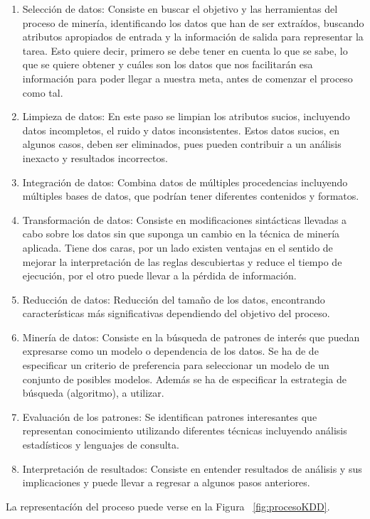 \begin{enumerate}
\item Selección de datos: Consiste en buscar el objetivo y las herramientas del proceso de minería, identificando los datos que han de ser extraídos, buscando atributos apropiados de entrada y la información de salida para representar la tarea. Esto quiere decir, primero se debe tener en cuenta lo que se sabe, lo que se quiere obtener y cuáles son los datos que nos facilitarán esa información para poder llegar a nuestra meta, antes de comenzar el proceso como tal.
\item Limpieza de datos: En este paso se limpian los atributos sucios, incluyendo datos incompletos, el ruido y datos inconsistentes. Estos datos sucios, en algunos casos, deben ser eliminados, pues pueden contribuir a un análisis inexacto y resultados incorrectos.
\item Integración de datos: Combina datos de múltiples procedencias incluyendo múltiples bases de datos, que podrían tener diferentes contenidos y formatos.
\item Transformación de datos: Consiste en modificaciones sintácticas llevadas a cabo sobre los datos sin que suponga un cambio en la técnica de minería aplicada. Tiene dos caras, por un lado existen ventajas en el sentido de mejorar la interpretación de las reglas descubiertas y reduce el tiempo de ejecución, por el otro puede llevar a la pérdida de información.
\item Reducción de datos: Reducción del tamaño de los datos, encontrando características más significativas dependiendo del objetivo del proceso.
\item Minería de datos: Consiste en la búsqueda de patrones de interés que puedan expresarse como un modelo o dependencia de los datos. Se ha de de especificar un criterio de preferencia para seleccionar un modelo de un conjunto de posibles modelos. Además se ha de especificar la estrategia de búsqueda (algoritmo), a utilizar.
\item Evaluación de los patrones: Se identifican patrones interesantes que representan conocimiento utilizando diferentes técnicas incluyendo análisis estadísticos y lenguajes de consulta.
\item Interpretación de resultados: Consiste en entender resultados de análisis y sus implicaciones y puede llevar a regresar a algunos pasos anteriores.
\end{enumerate}

La representacíón del proceso puede verse en la Figura ~\ref{fig:procesoKDD}.


